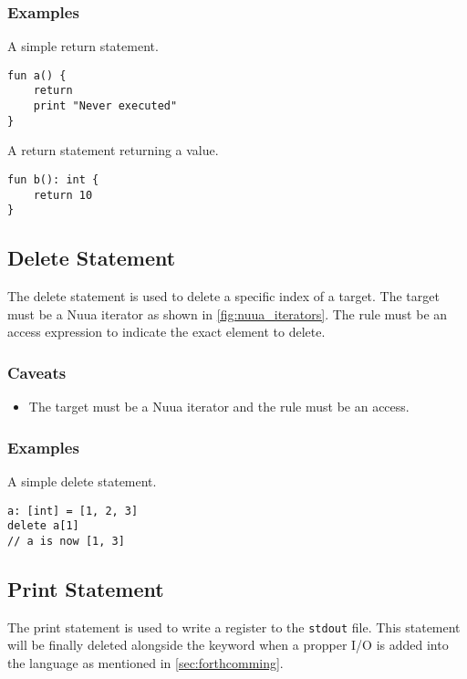 \subsubsection{Examples}

A simple return statement.
\begin{lstlisting}
fun a() {
    return
    print "Never executed"
}
\end{lstlisting}
A return statement returning a value.
\begin{lstlisting}
fun b(): int {
    return 10
}
\end{lstlisting}

\subsection{Delete Statement}
\label{sec:delete_statement}

The delete statement is used to delete a specific index of a target. The target must be a Nuua iterator as shown in \autoref{fig:nuua_iterators}.
The rule must be an access expression to indicate the exact element to delete.

\subsubsection{Caveats}

\begin{itemize}
    \item The target must be a Nuua iterator and the rule must be an access.
\end{itemize}

\subsubsection{Examples}

A simple delete statement.
\begin{lstlisting}
a: [int] = [1, 2, 3]
delete a[1]
// a is now [1, 3]
\end{lstlisting}

\subsection{Print Statement}
\label{sec:print_statement}

The print statement is used to write a register to the \texttt{stdout} file.
This statement will be finally deleted alongside the keyword when a propper I/O is added into the language as mentioned in \autoref{sec:forthcomming}.

